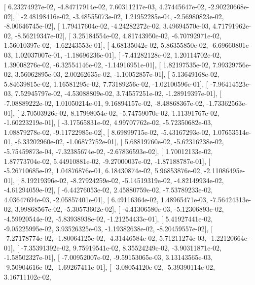 \documentclass{article}
\begin{document}
       [  6.23274927e-02,  -4.84717914e-02,   7.60311217e-03,
          4.27445647e-02,  -2.90220668e-02],
       [ -2.48198416e-02,  -3.48555073e-02,   1.21952285e-04,
         -2.56980823e-02,  -8.00646745e-02],
       [  1.79417604e-02,  -4.24282272e-02,   3.49694570e-03,
          4.71791962e-02,  -8.56219347e-02],
       [  3.25184554e-02,   4.81743950e-02,  -6.70792971e-02,
          1.56010397e-02,  -1.62243553e-01],
       [  4.68135042e-02,   5.86355850e-02,  -6.69660801e-03,
          1.02037007e-01,  -1.18696236e-01],
       [ -7.41282128e-02,   1.20114702e-02,   1.39008276e-02,
         -6.32554146e-02,  -1.14916951e-01],
       [  1.82197535e-02,   7.99329756e-02,   3.56062895e-03,
          2.00262635e-02,  -1.10052857e-01],
       [  5.13649168e-02,   5.84639815e-02,   1.16581295e-02,
          7.73189256e-02,  -1.02100596e-01],
       [ -7.96414523e-03,   7.52945797e-02,  -4.53088809e-02,
          3.74557251e-02,  -1.28919397e-01],
       [ -7.08889222e-02,   1.01050214e-01,   9.16894157e-02,
         -8.48868367e-02,  -1.73362563e-01],
       [  2.70503926e-02,   8.17998054e-02,  -5.74759070e-02,
          1.11391767e-02,  -1.60223219e-01],
       [ -3.17565831e-02,   4.99707762e-02,  -5.72350682e-03,
          1.08879278e-02,  -9.11722985e-02],
       [  8.69899715e-02,  -5.43167293e-02,   1.07653514e-01,
         -6.33202960e-02,  -1.06872752e-01],
       [  5.68819760e-02,  -5.62316238e-02,  -5.75459873e-04,
         -7.32385674e-02,  -2.67836593e-02],
       [  1.70012133e-02,   1.87773704e-02,   5.44910881e-02,
         -9.27000037e-02,  -1.87188787e-01],
       [ -5.26710685e-02,   1.04876876e-01,   6.18430874e-02,
          5.96853876e-02,  -2.11086495e-01],
       [  8.19219396e-02,  -8.27924259e-02,  -5.14519319e-02,
         -4.82149934e-02,  -4.61294059e-02],
       [ -6.44276053e-02,   2.45880759e-02,  -7.53789233e-02,
          4.03647694e-03,  -2.05857401e-01],
       [  6.49116364e-02,   1.48965471e-03,  -7.56424313e-02,
          3.99868567e-02,  -5.30573602e-02],
       [ -4.41306580e-03,  -5.12306893e-02,  -4.59920544e-02,
         -5.83938938e-02,  -1.21254433e-01],
       [  5.41927441e-02,  -9.05225995e-02,   3.93526325e-03,
         -1.19382638e-02,  -8.20459557e-02],
       [ -7.27178774e-02,  -1.80064125e-02,  -4.31446584e-02,
          5.71211274e-03,  -1.22120664e-01],
       [ -7.35391392e-02,   9.75919541e-02,   8.35524249e-02,
         -3.90311871e-02,  -1.58502327e-01],
       [ -7.00952007e-02,  -9.59153065e-03,   3.13143565e-03,
         -9.50904616e-02,  -1.69267411e-01],
       [ -3.08054120e-02,  -5.39390114e-02,   3.16711102e-02,
\end{document}
